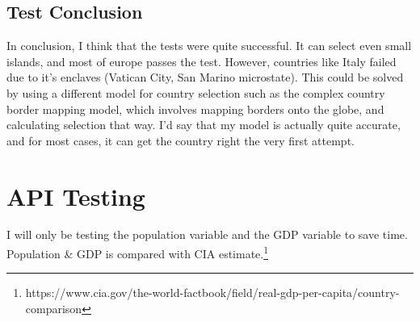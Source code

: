 \subsection{Test Conclusion}
In conclusion, I think that the tests were quite successful. It can select even small islands, and most of europe passes the test. However, countries like Italy failed due to it's enclaves (Vatican City, San Marino microstate). This could be solved by using a different model for country selection such as the complex country border mapping model, which involves mapping borders onto the globe, and calculating selection that way. I'd say that my model is actually quite accurate, and for most cases, it can get the country right the very first attempt.

\newpage
\section{API Testing}
I will only be testing the population variable and the GDP variable to save time. Population \& GDP is compared with CIA estimate.\footnote{https://www.cia.gov/the-world-factbook/field/real-gdp-per-capita/country-comparison}
